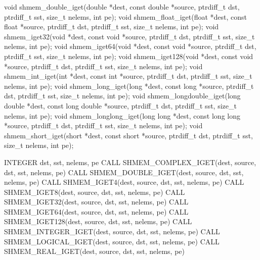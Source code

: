
\begin{apidefinition}

\begin{Csynopsis}
void shmem_double_iget(double *dest, const double *source, ptrdiff_t dst, ptrdiff_t sst, size_t nelems, int pe);
void shmem_float_iget(float *dest, const float *source, ptrdiff_t dst, ptrdiff_t sst, size_t nelems, int pe);
void shmem_iget32(void *dest, const void *source, ptrdiff_t dst, ptrdiff_t sst, size_t nelems, int pe);
void shmem_iget64(void *dest, const void *source, ptrdiff_t dst, ptrdiff_t sst, size_t nelems, int pe);
void shmem_iget128(void *dest, const void *source, ptrdiff_t  dst, ptrdiff_t sst, size_t nelems, int pe);
void shmem_int_iget(int *dest, const int *source, ptrdiff_t dst, ptrdiff_t sst, size_t nelems, int pe);
void shmem_long_iget(long *dest, const  long  *source,  ptrdiff_t dst, ptrdiff_t sst, size_t nelems, int pe);
void shmem_longdouble_iget(long double *dest, const long double *source, ptrdiff_t dst, ptrdiff_t sst, size_t nelems, int pe);
void shmem_longlong_iget(long long *dest, const long long *source, ptrdiff_t dst, ptrdiff_t sst, size_t nelems, int pe);
void shmem_short_iget(short *dest, const short *source, ptrdiff_t dst, ptrdiff_t sst, size_t nelems, int pe);
\end{Csynopsis}

\begin{Fsynopsis}
INTEGER dst, sst, nelems, pe
CALL SHMEM_COMPLEX_IGET(dest, source, dst, sst, nelems, pe)
CALL SHMEM_DOUBLE_IGET(dest, source, dst, sst, nelems, pe)
CALL SHMEM_IGET4(dest, source, dst, sst, nelems, pe)
CALL SHMEM_IGET8(dest, source, dst, sst, nelems, pe)
CALL SHMEM_IGET32(dest, source, dst, sst, nelems, pe)
CALL SHMEM_IGET64(dest, source, dst, sst, nelems, pe)
CALL SHMEM_IGET128(dest, source, dst, sst, nelems, pe)
CALL SHMEM_INTEGER_IGET(dest, source, dst, sst, nelems, pe)
CALL SHMEM_LOGICAL_IGET(dest, source, dst, sst, nelems, pe)
CALL SHMEM_REAL_IGET(dest, source, dst, sst, nelems, pe)
\end{Fsynopsis}


\end{apidefinition}
